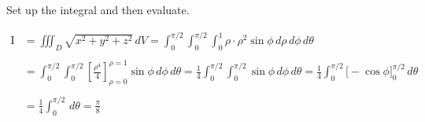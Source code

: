 \documentclass{article}
\begin{document}
\hfill

\noindent Set up the integral and then evaluate.

\begin{align*}
\mathrm{I}&=\iiint_D\sqrt{x^2+y^2+z^2}\,dV=\int_0^{\pi/2}\int_0^{\pi/2}\int_0^1\rho\cdot\rho^2\sin\phi\,d\rho\,d\phi\,d\theta\\\\&=\int_0^{\pi/2}\int_0^{\pi/2}\left[\frac{\rho^4}4\right]_{\rho=0}^{\rho=1}\sin\phi\,d\phi\,d\theta=\frac14\int_0^{\pi/2}\int_0^{\pi/2}\sin\phi\,d\phi\,d\theta=\frac14\int_0^{\pi/2}\bigg[-\cos\phi\bigg]_0^{\pi/2}\,d\theta\\\\&=\frac14\int_0^{\pi/2}\,d\theta=\boxed{\frac\pi8}
\end{align*}
\end{document}
